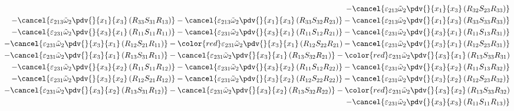\begin{equation}
\begin{split}
		-\cancel{\varepsilon_{213}\tilde{\omega}_{2}\pdv{}{x_{1}}{x_{3}}\left(R_{32}S_{23}R_{33}\right)}\\
		-\cancel{\varepsilon_{213}\tilde{\omega}_{2}\pdv{}{x_{1}}{x_{3}}\left(R_{33}S_{31}R_{13}\right)}
		-\cancel{\varepsilon_{213}\tilde{\omega}_{2}\pdv{}{x_{1}}{x_{3}}\left(R_{33}S_{32}R_{23}\right)}
		-\cancel{\varepsilon_{213}\tilde{\omega}_{2}\pdv{}{x_{1}}{x_{3}}\left(R_{33}S_{33}R_{33}\right)}\\
		-\cancel{\varepsilon_{231}\tilde{\omega}_{2}\pdv{}{x_{3}}{x_{1}}\left(R_{11}S_{11}R_{11}\right)}
		-\cancel{\varepsilon_{231}\tilde{\omega}_{2}\pdv{}{x_{3}}{x_{1}}\left(R_{11}S_{12}R_{21}\right)}
		-\cancel{\varepsilon_{231}\tilde{\omega}_{2}\pdv{}{x_{3}}{x_{1}}\left(R_{11}S_{13}R_{31}\right)}\\
		-\cancel{\varepsilon_{231}\tilde{\omega}_{2}\pdv{}{x_{3}}{x_{1}}\left(R_{12}S_{21}R_{11}\right)}
		-{\color{red}\varepsilon_{231}\tilde{\omega}_{2}\pdv{}{x_{3}}{x_{1}}\left(R_{12}S_{22}R_{21}\right)}
		-\cancel{\varepsilon_{231}\tilde{\omega}_{2}\pdv{}{x_{3}}{x_{1}}\left(R_{12}S_{23}R_{31}\right)}\\
		-\cancel{\varepsilon_{231}\tilde{\omega}_{2}\pdv{}{x_{3}}{x_{1}}\left(R_{13}S_{31}R_{11}\right)}
		-\cancel{\varepsilon_{231}\tilde{\omega}_{2}\pdv{}{x_{3}}{x_{1}}\left(R_{13}S_{32}R_{21}\right)}
		-{\color{red}\varepsilon_{231}\tilde{\omega}_{2}\pdv{}{x_{3}}{x_{1}}\left(R_{13}S_{33}R_{31}\right)}\\
		-\cancel{\varepsilon_{231}\tilde{\omega}_{2}\pdv{}{x_{3}}{x_{2}}\left(R_{11}S_{11}R_{12}\right)}
		-\cancel{\varepsilon_{231}\tilde{\omega}_{2}\pdv{}{x_{3}}{x_{2}}\left(R_{11}S_{12}R_{22}\right)}
		-\cancel{\varepsilon_{231}\tilde{\omega}_{2}\pdv{}{x_{3}}{x_{2}}\left(R_{11}S_{13}R_{32}\right)}\\
		-\cancel{\varepsilon_{231}\tilde{\omega}_{2}\pdv{}{x_{3}}{x_{2}}\left(R_{12}S_{21}R_{12}\right)}
		-\cancel{\varepsilon_{231}\tilde{\omega}_{2}\pdv{}{x_{3}}{x_{2}}\left(R_{12}S_{22}R_{22}\right)}
		-\cancel{\varepsilon_{231}\tilde{\omega}_{2}\pdv{}{x_{3}}{x_{2}}\left(R_{12}S_{23}R_{32}\right)}\\
		-\cancel{\varepsilon_{231}\tilde{\omega}_{2}\pdv{}{x_{3}}{x_{2}}\left(R_{13}S_{31}R_{12}\right)}
		-\cancel{\varepsilon_{231}\tilde{\omega}_{2}\pdv{}{x_{3}}{x_{2}}\left(R_{13}S_{32}R_{22}\right)}
		-{\color{red}\varepsilon_{231}\tilde{\omega}_{2}\pdv{}{x_{3}}{x_{2}}\left(R_{13}S_{33}R_{32}\right)}\\
		-\cancel{\varepsilon_{231}\tilde{\omega}_{2}\pdv{}{x_{3}}{x_{3}}\left(R_{11}S_{11}R_{13}\right)}

\end{split}
\end{equation}
